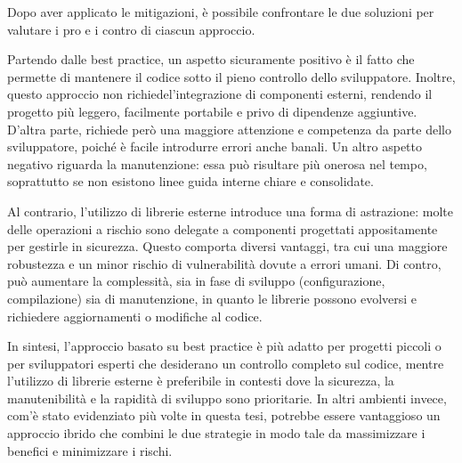 Dopo aver applicato le mitigazioni, è possibile confrontare le due soluzioni per
valutare i pro e i contro di ciascun approccio.

Partendo dalle best practice, un aspetto sicuramente positivo è il fatto che permette
di mantenere il codice sotto il pieno controllo dello sviluppatore. Inoltre, questo
approccio non richiedel'integrazione di componenti esterni, rendendo il progetto
più leggero, facilmente portabile e privo di dipendenze aggiuntive. D'altra
parte, richiede però una maggiore attenzione e competenza da parte dello sviluppatore,
poiché è facile introdurre errori anche banali. Un altro aspetto negativo riguarda
la manutenzione: essa può risultare più onerosa nel tempo, soprattutto se non esistono
linee guida interne chiare e consolidate.

Al contrario, l'utilizzo di librerie esterne introduce una forma di astrazione: molte
delle operazioni a rischio sono delegate a componenti progettati appositamente per
gestirle in sicurezza. Questo comporta diversi vantaggi, tra cui una maggiore robustezza
e un minor rischio di vulnerabilità dovute a errori umani. Di contro, può aumentare
la complessità, sia in fase di sviluppo (configurazione, compilazione) sia di manutenzione,
in quanto le librerie possono evolversi e richiedere aggiornamenti o modifiche
al codice.

In sintesi, l'approccio basato su best practice è più adatto per progetti piccoli
o per sviluppatori esperti che desiderano un controllo completo sul codice,
mentre l'utilizzo di librerie esterne è preferibile in contesti dove la
sicurezza, la manutenibilità e la rapidità di sviluppo sono prioritarie. In
altri ambienti invece, com'è stato evidenziato più volte in questa tesi,
potrebbe essere vantaggioso un approccio ibrido che combini le due strategie in
modo tale da massimizzare i benefici e minimizzare i rischi.
